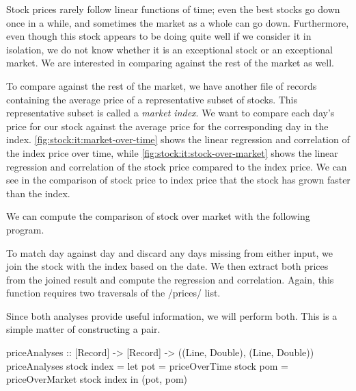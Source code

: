 Stock prices rarely follow linear functions of time; even the best stocks go down once in a while, and sometimes the market as a whole can go down.
Furthermore, even though this stock appears to be doing quite well if we consider it in isolation, we do not know whether it is an exceptional stock or an exceptional market.
We are interested in comparing against the rest of the market as well.

To compare against the rest of the market, we have another file of records containing the average price of a representative subset of stocks.
This representative subset is called a \emph{market index}.
We want to compare each day's price for our stock against the average price for the corresponding day in the index.
\autoref{fig:stock:it:market-over-time} shows the linear regression and correlation of the index price over time, while \autoref{fig:stock:it:stock-over-market} shows the linear regression and correlation of the stock price compared to the index price.
We can see in the comparison of stock price to index price that the stock has grown faster than the index.

We can compute the comparison of stock over market with the following program.


To match day against day and discard any days missing from either input, we join the stock with the index based on the date.
We then extract both prices from the joined result and compute the regression and correlation.
Again, this function requires two traversals of the \Hs/prices/ list.

Since both analyses provide useful information, we will perform both.
This is a simple matter of constructing a pair.

\begin{haskell}
priceAnalyses :: [Record] -> [Record] -> ((Line, Double), (Line, Double))
priceAnalyses stock index =
  let pot = priceOverTime   stock
      pom = priceOverMarket stock index
  in (pot, pom)
\end{haskell}

